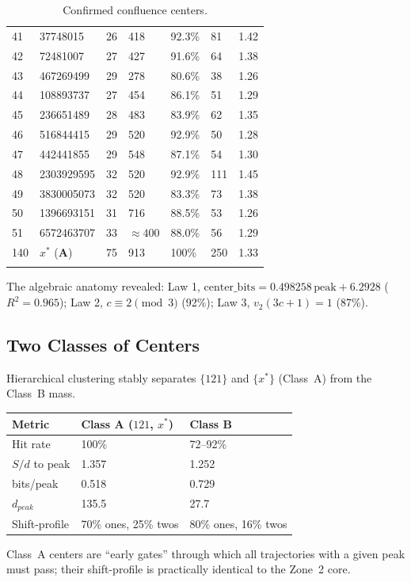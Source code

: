 \documentclass[12pt,a4paper]{article}
\theoremstyle{remark}
\begin{document}
\begin{longtable}{lllllll}
41 & 37748015 & 26 & 418 & 92.3\% & 81 & 1.42 \\
42 & 72481007 & 27 & 427 & 91.6\% & 64 & 1.38 \\
43 & 467269499 & 29 & 278 & 80.6\% & 38 & 1.26 \\
44 & 108893737 & 27 & 454 & 86.1\% & 51 & 1.29 \\
45 & 236651489 & 28 & 483 & 83.9\% & 62 & 1.35 \\
46 & 516844415 & 29 & 520 & 92.9\% & 50 & 1.28 \\
47 & 442441855 & 29 & 548 & 87.1\% & 54 & 1.30 \\
48 & 2303929595 & 32 & 520 & 92.9\% & 111 & 1.45 \\
49 & 3830005073 & 32 & 520 & 83.3\% & 73 & 1.38 \\
50 & 1396693151 & 31 & 716 & 88.5\% & 53 & 1.26 \\
51 & 6572463707 & 33 & $\approx400$ & 88.0\% & 56 & 1.29 \\
140 & $x^*$ (\textbf{A}) & 75 & 913 & 100\% & 250 & 1.33 \\
\bottomrule
\caption*{Confirmed confluence centers.}
\end{longtable}
The algebraic anatomy revealed: Law 1, $\mathrm{center\_bits}=0.498258\,\mathrm{peak}+6.2928$ ($R^2=0.965$); Law 2, $c\equiv2\pmod3$ (92\%); Law 3, $v_2(3c+1)=1$ (87\%).

\subsection{Two Classes of Centers}
Hierarchical clustering stably separates $\{121\}$ and $\{x^*\}$ (Class~A) from the Class~B mass.
\begin{table}[h]
\centering
\begin{tabular}{lll}
\toprule
\textbf{Metric} & \textbf{Class A ($121$, $x^*$)} & \textbf{Class B} \\
\midrule
Hit rate & 100\% & 72--92\% \\
$S/d$ to peak & 1.357 & 1.252 \\
bits/peak & 0.518 & 0.729 \\
$d_{peak}$ & 135.5 & 27.7 \\
Shift-profile & 70\% ones, 25\% twos & 80\% ones, 16\% twos \\
\bottomrule
\end{tabular}
\end{table}
Class~A centers are ``early gates'' through which all trajectories with a given peak must pass; their shift-profile is practically identical to the Zone~2 core.
\end{document}

